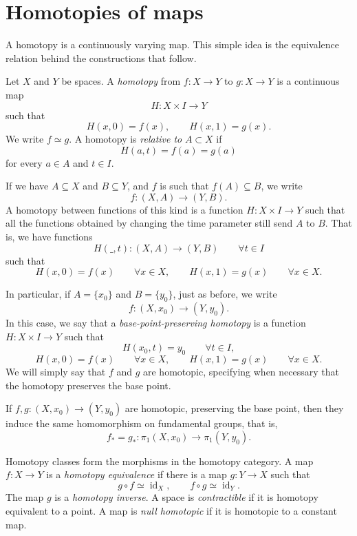 \section{Homotopies of maps}
\label{section-basic-notions}

A homotopy is a continuously varying
map. This simple idea is the equivalence
relation behind the constructions that
follow.

\begin{definition}
\label{definition-homotopic-maps}
\label{def:func-homot}
Let $X$ and $Y$ be spaces. A
\emph{homotopy} from $f:X\to Y$ to
$g:X\to Y$ is a continuous map
$$
H:X\times I\longrightarrow Y
$$
such that
$$
H(x,0)=f(x),
\qquad
H(x,1)=g(x).
$$
We write $f\simeq g$. A homotopy is
\emph{relative to} $A\subset X$ if
$$
H(a,t)=f(a)=g(a)
$$
for every $a\in A$ and $t\in I$.
\end{definition}

If we have $A\subseteq X$ and $B\subseteq Y$,
and $f$ is
such that $f(A)\subseteq B$, we write
$$
f:(X,A)\to(Y,B).
$$
A homotopy between functions of this kind is
a function
$H:X\times I\to Y$ such that all the
functions obtained by
changing the time parameter still send $A$ to
$B$. That is,
we have functions
$$
H(\_,t):(X,A)\to(Y,B)\qquad\forall t\in I
$$
such that
$$
H(x,0)=f(x)\qquad\forall x\in X,
\qquad
H(x,1)=g(x)\qquad\forall x\in X.
$$

In particular, if $A=\{x_0\}$ and
$B=\{y_0\}$, just as
before, we write
$$
f:(X,x_0)\to(Y,y_0).
$$
In this case, we say that a
\emph{base-point-preserving
homotopy} is a function $H:X\times I\to Y$
such that
$$
H(x_0,t)=y_0\qquad\forall t\in I,
$$
$$
H(x,0)=f(x)\qquad\forall x\in X,
\qquad
H(x,1)=g(x)\qquad\forall x\in X.
$$
We will simply say that $f$ and $g$ are
homotopic,
specifying when necessary that the homotopy
preserves the
base point.

\begin{proposition}
If $f,g:(X,x_0)\to(Y,y_0)$ are homotopic,
preserving the
base point, then they induce the same
homomorphism on
fundamental groups, that is,
$$
f_*=g_*:\pi_1(X,x_0)\to\pi_1(Y,y_0).
$$
\end{proposition}

Homotopy classes form the morphisms in the
homotopy category. A map $f:X\to Y$ is a
\emph{homotopy equivalence} if there is a
map $g:Y\to X$ such that
$$
g\circ f\simeq\operatorname{id}_X,
\qquad
f\circ g\simeq\operatorname{id}_Y.
$$
The map $g$ is a \emph{homotopy inverse}.
A space is \emph{contractible} if it is
homotopy equivalent to a point. A map is
\emph{null homotopic} if it is homotopic
to a constant map.

